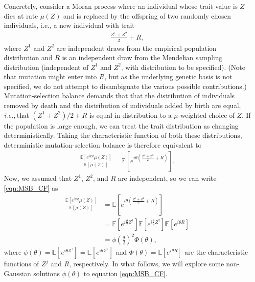 \documentclass{article}
\newcommand{\E}{\mathbb{E}}
\newcommand{\R}{\mathbb{R}}
\newcommand{\ie}{\textit{i.e.,}\,}
\newcommand{\eg}{\textit{e.g.,}\,}
\newcommand{\1}{\mathbbm{1}}
\theoremstyle{remark}
\theoremstyle{definition}
\begin{document}
Concretely, consider a Moran process where an individual whose trait value is $Z$ dies at rate $\mu(Z)$
and is replaced by the offspring of two randomly chosen individuals,
i.e., a new individual with trait 
\begin{align*}
  \frac{Z^{1} +Z^{2}}{2} + R ,
\end{align*}
where $Z^{1}$ and $Z^{2}$ are independent draws from the empirical population distribution
and $R$ is an independent draw from the Mendelian sampling distribution
(independent of $Z^{1}$ and $Z^{2}$, with distribution to be specified). 
(Note that mutation might enter into $R$, but as the underlying genetic basis is not specified,
we do not attempt to disambiguate the various possible contributions.) 
Mutation-selection balance demands that that
the distribution of individuals removed by death
and the distribution of individuals added by birth are equal,
\ie that $(Z^{1} +Z^{2})/2 + R$ is equal in distribution
to a $\mu$-weighted choice of $Z$.
% 
If the population is large enough, 
we can treat the trait distribution as changing deterministically.
Taking the characteristic function of both these distributions,
deterministic mutation-selection balance is therefore equivalent to
\begin{align} \label{eqn:MSB_CF}
    \frac{\E\left[ e^{i \theta Z}\mu(Z) \right]}{\E[\mu(Z)]}
    =
    \E\left[ e^{i\theta\left(\frac{Z^{1} +Z^{2}}{2} + R \right)}\right] .
\end{align}
Now, we assumed that $Z^{1}$, $Z^{2}$, and $R$ are independent, so we can write \eqref{eqn:MSB_CF} as 
\begin{align*}
    \frac{\E\left[ e^{i\theta Z} \mu(Z) \right]}{\E[\mu(Z)]} &= \E\left[ e^{i\theta\left(\frac{Z^{1} +Z^{2}}{2} + R \right)}\right]\\
	&= \E\left[e^{i\frac{\theta}{2} Z^{1}}\right]\E\left[e^{i\frac{\theta}{2} Z^{2}}\right]\E\left[e^{i\theta R}\right]\\
	&= \phi\left(\frac{\theta}{2}\right)^{2} \Phi(\theta),
\end{align*}
where
$ \phi(\theta) = \mathbb{E}\left[e^{i\theta Z^{1}}\right] = \mathbb{E}\left[e^{i\theta Z^{2}}\right] $
and
$ \Phi(\theta) = \mathbb{E}\left[e^{i\theta R}\right] $
are the characteristic functions of $Z^{j}$ and $R$, respectively. 
In what follows, we will explore some non-Gaussian solutions $\phi(\theta)$ to equation \eqref{eqn:MSB_CF}.
\end{document}
